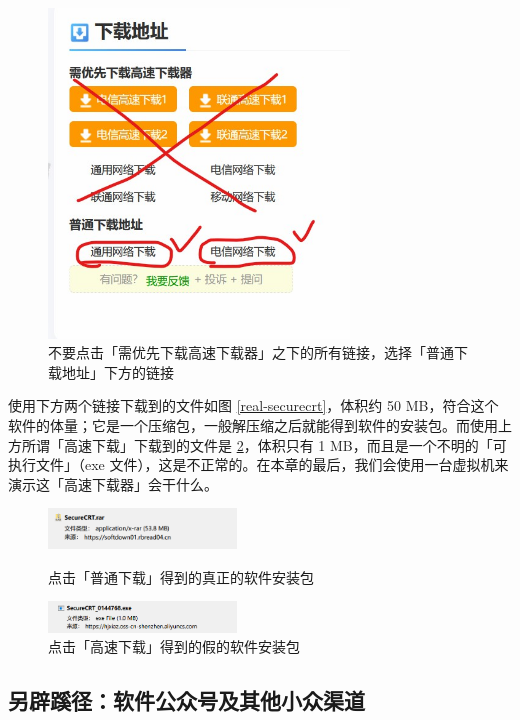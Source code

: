 \begin{figure}[H]
  \centering
  \includegraphics[width=8cm]{assets/Huajun_3.jpg}
  \caption{不要点击「需优先下载高速下载器」之下的所有链接，选择「普通下载地址」下方的链接}
  \label{huajun-3}
\end{figure}

使用下方两个链接下载到的文件如图 \ref{real-securecrt}，体积约 50 MB，符合这个软件的体量；它是一个压缩包，一般解压缩之后就能得到软件的安装包。而使用上方所谓「高速下载」下载到的文件是 \ref{fake-securecrt}，体积只有 1 MB，而且是一个不明的「可执行文件」（exe 文件），这是不正常的。在本章的最后，我们会使用一台虚拟机来演示这「高速下载器」会干什么。

\begin{figure}[htb!]
  \centering
  \begin{minipage}{6cm}
    \centering
    \includegraphics[width=5cm]{assets/Real_SecureCRT.png}
    \caption{点击「普通下载」得到的真正的软件安装包}
    \label{real-securecrt}
  \end{minipage}
  \qquad
  \begin{minipage}{6cm}
    \centering
    \includegraphics[width=5cm]{assets/Fake_SecureCRT.png}
    \caption{点击「高速下载」得到的假的软件安装包}
    \label{fake-securecrt}
  \end{minipage} 
\end{figure}

\subsection{另辟蹊径：软件公众号及其他小众渠道}

